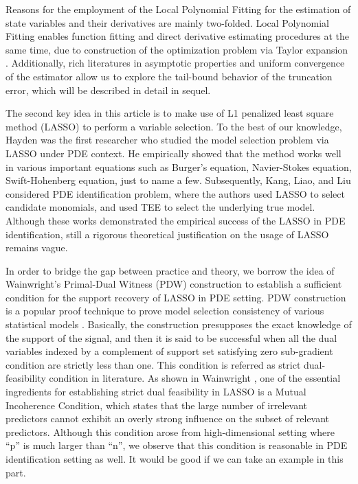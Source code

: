 \documentclass[a4paper,11pt]{article}
\begin{document}
Reasons for the employment of the Local Polynomial Fitting for the estimation of state variables and their derivatives are mainly two-folded. Local Polynomial Fitting enables function fitting and direct derivative estimating procedures at the same time, due to construction of the optimization problem via Taylor expansion \cite{fan1997local}. Additionally, rich literatures in asymptotic properties and uniform convergence of the estimator \cite{fan1997local,tusnady1977remark,mack1982weak} allow us to explore the tail-bound behavior of the truncation error, which will be described in detail in sequel.

The second key idea in this article is to make use of L1 penalized least square method (LASSO) to perform a variable selection. To the best of our knowledge, Hayden \cite{schaeffer2017learning} was the first researcher who studied the model selection problem via LASSO under PDE context. He empirically showed that the method works well in various important equations such as Burger’s equation, Navier-Stokes equation, Swift-Hohenberg equation, just to name a few. Subsequently, Kang, Liao, and Liu \cite{kang2019ident} considered PDE identification problem, where the authors used LASSO to select candidate monomials, and used TEE to select the underlying true model. Although these works demonstrated the empirical success of the LASSO in PDE identification, still a rigorous theoretical justification on the usage of LASSO remains vague.

In order to bridge the gap between practice and theory, we borrow the idea of Wainwright's Primal-Dual Witness (PDW) construction to establish a sufficient condition for the support recovery of LASSO in PDE setting. PDW construction is a popular proof technique to prove model selection consistency of various statistical models \cite{ravikumar2010high,ravikumar2009sparse,ravikumar2011high,obozinski2008union,wang2013block,jalali2010dirty,wainwright2009sharp}. Basically, the construction presupposes the exact knowledge of the support of the signal, and then it is said to be successful when all the dual variables indexed by a complement of support set satisfying zero sub-gradient condition are strictly less than one. This condition is referred as strict dual-feasibility condition in literature. As shown in Wainwright \cite{wainwright2009sharp}, one of the essential ingredients for establishing strict dual feasibility in LASSO is a Mutual Incoherence Condition, which states that the large number of irrelevant predictors cannot exhibit an overly strong influence on the subset of relevant predictors. Although this condition arose from high-dimensional setting where “p” is much larger than “n”, we observe that this condition is reasonable in PDE identification setting as well. It would be good if we can take an example in this part.
\end{document}
